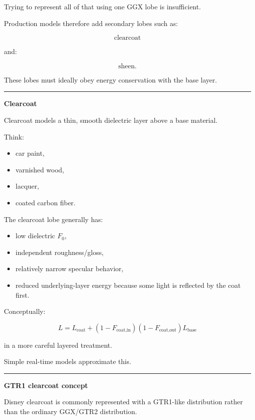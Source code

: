 Trying to represent all of that using one GGX lobe is insufficient.

Production models therefore add secondary lobes such as:

\[
\text{clearcoat}
\]

and:

\[
\text{sheen}.
\]

These lobes must ideally obey energy conservation with the base layer.

\begin{center}\rule{0.5\linewidth}{0.5pt}\end{center}

\textbf{Clearcoat}

Clearcoat models a thin, smooth dielectric layer above a base material.

Think:

\begin{itemize}
\tightlist
\item
  car paint,
\item
  varnished wood,
\item
  lacquer,
\item
  coated carbon fiber.
\end{itemize}

The clearcoat lobe generally has:

\begin{itemize}
\tightlist
\item
  low dielectric \(F_0\),
\item
  independent roughness/gloss,
\item
  relatively narrow specular behavior,
\item
  reduced underlying-layer energy because some light is reflected by the coat first.
\end{itemize}

Conceptually:

\[
L=
L_{\text{coat}}
+
(1-F_{\text{coat,in}})
(1-F_{\text{coat,out}})
L_{\text{base}}
\]

in a more careful layered treatment.

Simple real-time models approximate this.

\begin{center}\rule{0.5\linewidth}{0.5pt}\end{center}

\textbf{GTR1 clearcoat concept}

Disney clearcoat is commonly represented with a GTR1-like distribution rather than the ordinary GGX/GTR2 distribution.

